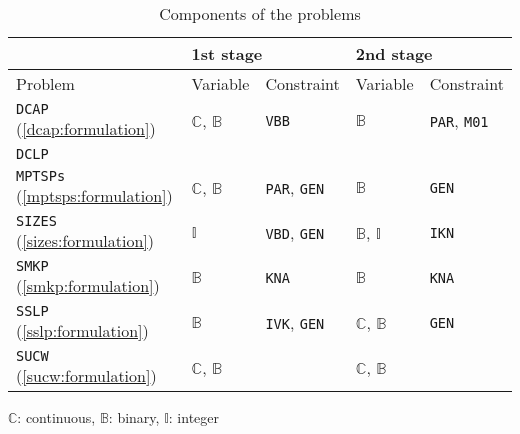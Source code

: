 \begin{table}[H]
	\centering
	\caption{Components of the problems}
	\label{table:prob_class}
	\begin{threeparttable}
		\begin{tabular}{@{}lllll@{}}
			\toprule
			& \multicolumn{2}{l}{1st stage}                              				  	& \multicolumn{2}{l}{2nd stage}                             			        \\ \midrule
			Problem 	     & Variable                    & Constraint                   	& Variable                    & Constraint                  				    \\ \midrule
			\texttt{DCAP} (\ref{dcap:formulation})    & $\mathbb{C}$, $\mathbb{B}$  & \texttt{VBB}                	& $\mathbb{B}$                & \texttt{PAR}, \texttt{M01} 			    		\\
			\texttt{DCLP}  	 &							   &								& 			 	  &													\\				
			\texttt{MPTSPs} (\ref{mptsps:formulation})  & $\mathbb{C}$, $\mathbb{B}$  & \texttt{PAR}, \texttt{GEN}		& $\mathbb{B}$                & \texttt{GEN}               						\\
			\texttt{SIZES} (\ref{sizes:formulation})   & $\mathbb{I}$ 			   & \texttt{VBD}, \texttt{GEN} 	& $\mathbb{B}$, $\mathbb{I}$  & \texttt{IKN}             						\\
			\texttt{SMKP} (\ref{smkp:formulation})   & $\mathbb{B}$                & \texttt{KNA}                	& $\mathbb{B}$                & \texttt{KNA}              						\\
			\texttt{SSLP} (\ref{sslp:formulation})   & $\mathbb{B}$                & \texttt{IVK}, \texttt{GEN} 	& $\mathbb{C}$, $\mathbb{B}$  & \texttt{GEN}             						\\
			\texttt{SUCW} (\ref{sucw:formulation})   & $\mathbb{C}$, $\mathbb{B}$                 &                              	& $\mathbb{C}$, $\mathbb{B}$  &                             					\\ \bottomrule
		\end{tabular}
		
		\begin{tablenotes}
			\small
			\item $\mathbb{C}$: continuous, $\mathbb{B}$: binary, $\mathbb{I}$: integer
		\end{tablenotes}
	\end{threeparttable}
\end{table}